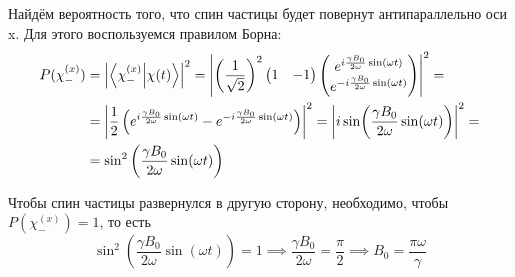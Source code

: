 Найдём вероятность того, что спин частицы будет повернут антипараллельно оси x. Для этого воспользуемся правилом Борна:
\begin{align*}
P(\chi^{(x)}_-) &= \left|\bra{\chi^{(x)}_-}\ket{\chi(t)}\right|^2 = \left|\left(\frac{1}{\sqrt{2}}\right)^2\begin{pmatrix}1 & -1\end{pmatrix}\begin{pmatrix} e^{i\frac{\gamma B_0}{2\omega}\sin(\omega t)} \\ e^{-i\frac{\gamma B_0}{2\omega}\sin(\omega t)} \end{pmatrix}\right|^2 = \\ &= \left|\frac{1}{2}\left(e^{i\frac{\gamma B_0}{2\omega}\sin(\omega t)} - e^{-i\frac{\gamma B_0}{2\omega}\sin(\omega t)}\right)\right|^2 = \left|i\sin(\frac{\gamma B_0}{2\omega}\sin(\omega t))\right|^2 = \\
 & = \sin^2\left(\frac{\gamma B_0}{2\omega}\sin(\omega t)\right)
\end{align*}

Чтобы спин частицы развернулся в другую сторону, необходимо, чтобы $P(\chi^{(x)}_-) = 1$, то есть
\[
\sin^2\left(\frac{\gamma B_0}{2\omega}\sin(\omega t)\right) = 1 \implies \frac{\gamma B_0}{2\omega} = \frac{\pi}{2} \implies B_0 = \frac{\pi\omega}{\gamma}
\]

